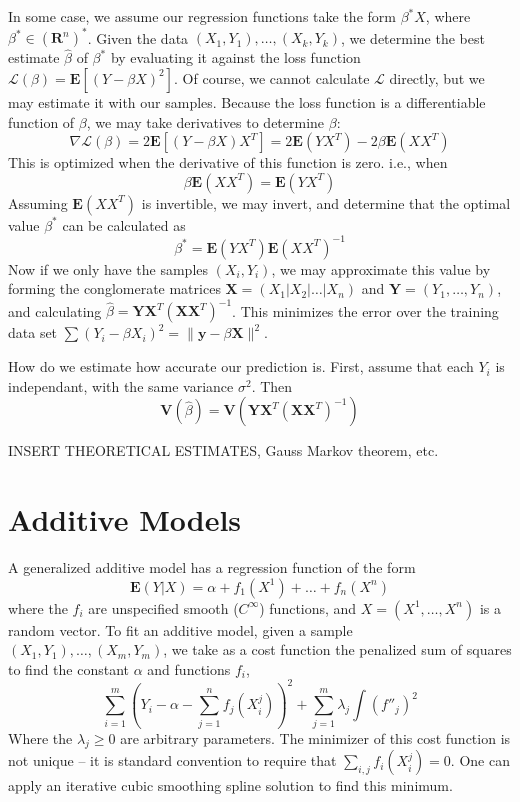 In some case, we assume our regression functions take the form $\beta^* X$, where $\beta^* \in (\mathbf{R}^n)^*$. Given the data $(X_1, Y_1), \dots, (X_k, Y_k)$, we determine the best estimate $\widehat{\beta}$ of $\beta^*$ by evaluating it against the loss function $\mathcal{L}(\beta) = \mathbf{E}[(Y - \beta X)^2]$. Of course, we cannot calculate $\mathcal{L}$ directly, but we may estimate it with our samples. Because the loss function is a differentiable function of $\beta$, we may take derivatives to determine $\beta$:
%
\[ \nabla \mathcal{L} (\beta) = 2 \mathbf{E}[(Y - \beta X)X^T] = 2 \mathbf{E}(YX^T) - 2\beta \mathbf{E}(XX^T) \]
%
This is optimized when the derivative of this function is zero. i.e., when
%
\[ \beta \mathbf{E}(XX^T) = \mathbf{E}(YX^T) \]
%
Assuming $\mathbf{E}(XX^T)$ is invertible, we may invert, and determine that the optimal value $\beta^*$ can be calculated as
%
\[ \beta^* = \mathbf{E}(YX^T) \mathbf{E}(XX^T)^{-1} \]
%
Now if we only have the samples $(X_i, Y_i)$, we may approximate this value by forming the conglomerate matrices $\mathbf{X} = (X_1 | X_2 | \dots | X_n)$ and $\mathbf{Y} = (Y_1, \dots, Y_n)$, and calculating $\widehat{\beta} = \mathbf{Y} \mathbf{X}^T (\mathbf{X} \mathbf{X}^T)^{-1}$. This minimizes the error over the training data set $\sum (Y_i - \beta X_i)^2 = \|\mathbf{y} - \beta \mathbf{X}\|^2$.

How do we estimate how accurate our prediction is. First, assume that each $Y_i$ is independant, with the same variance $\sigma^2$. Then
%
\[ \mathbf{V}(\widehat{\beta}) = \mathbf{V}(\mathbf{Y} \mathbf{X}^T (\mathbf{X} \mathbf{X}^T)^{-1}) \]

INSERT THEORETICAL ESTIMATES, Gauss Markov theorem, etc.





\section{Additive Models}

A generalized additive model has a regression function of the form
%
\[ \mathbf{E}(Y|X) = \alpha + f_1(X^1) + \dots + f_n(X^n) \]
%
where the $f_i$ are unspecified smooth ($C^\infty$) functions, and $X = (X^1, \dots, X^n)$ is a random vector. To fit an additive model, given a sample $(X_1, Y_1), \dots, (X_m, Y_m)$, we take as a cost function the penalized sum of squares to find the constant $\alpha$ and functions $f_i$,
%
\[ \sum_{i = 1}^m \left( Y_i - \alpha - \sum_{j = 1}^n f_j(X_i^j) \right)^2 + \sum_{j = 1}^m \lambda_j \int (f''_j)^2 \]
%
Where the $\lambda_j \geq 0$ are arbitrary parameters. The minimizer of this cost function is not unique -- it is standard convention to require that $\sum_{i,j} f_i(X_i^j) = 0$. One can apply an iterative cubic smoothing spline solution to find this minimum.

